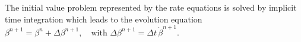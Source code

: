 \begin{comment}
\begin{figure}[h]
\centering
\psfragfig[width = 0.7\textwidth, trim = 0 0 0 0, clip = true]{figs/fictitiousTimeSteps}
\caption{Two isothermal cooling steps.}
\label{fig:ficTime}
\end{figure}

\begin{figure}[h]
\centering
\psfragfig[width = 0.3\textwidth, trim = 0 0 0 0, clip = true]{figs/isothermalStepsTt} 
\caption{Discretized example cooling curve.}
\label{fig:discTt}
\end{figure}

\begin{figure}[h]
\centering
\psfragfig[width = 0.9\textwidth, trim = 0 0 0 0, clip = true]{figs/isothermalSteps} 
\caption{}
\label{fig:}
\end{figure}




To incorporate the fictitious time into the rate equation the steps laid out in (Reti 2001) are done. Using the JMAK law \ref{eq:JMAK}, the fictitious time for a given volume fraction $\beta_B$ and a temperature $T$ is derived as 
\begin{equation}
	t^\ast = \left( \frac{\ln A}{b(T_{i+1})}\right)^\frac{1}{N(T_{i+1})}, \quad A = \frac{\hat{\beta}}{\hat{\beta}-\beta_i}  \quad.
\end{equation}
This relation then is inserted into the rate equation \ref{eq:ABrate} to replace the isothermal transformation time and eliminate the explicit time dependence 
\begin{equation}
	\dot{\beta} = N\,b^{\frac{1}{N}}\,(\hat{\beta}-\beta)\,\left(\ln A \right)^{1-\frac{1}{N}}\quad. \label{ABrate}
\end{equation}
To ... enable more phases the maximal volume fraction  of bainite $\hat{\beta}$ in (Oliviera 2010) is interpreted as 
\begin{equation}
	\hat{\beta} = 1 - \beta_M \quad. 
\end{equation}
This leads to a desired coupling of the rate equations of Bainite and Martensite. \\\\

\end{comment}
The initial value problem represented by the rate equations is solved by implicit time integration which leads to the evolution equation $\beta^{n+1} = \beta^n + \Delta \beta^{n+1}, \quad \text{with  } \Delta \beta^{n+1} = \Delta t \, \dot{\beta}^{n+1}$. \\
